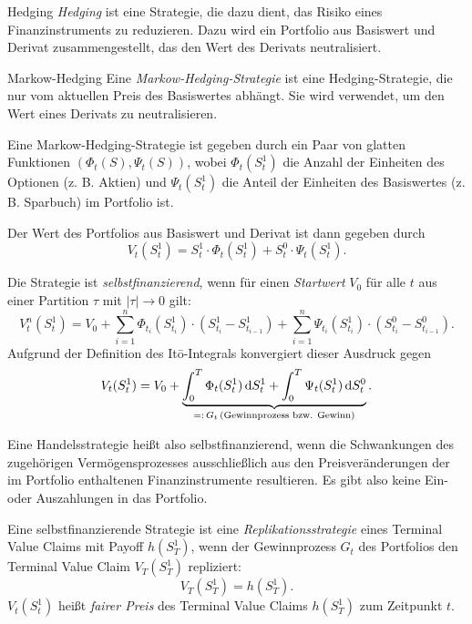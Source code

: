 \begin{bonus}{Hedging}
    \emph{Hedging} ist eine Strategie, die dazu dient, das Risiko eines Finanzinstruments zu reduzieren.
    Dazu wird ein Portfolio aus Basiswert und Derivat zusammengestellt, das den Wert des Derivats neutralisiert.
\end{bonus}

\begin{defi}{Markow-Hedging}
    Eine \emph{Markow-Hedging-Strategie} ist eine Hedging-Strategie, die nur vom aktuellen Preis des Basiswertes abhängt.
    Sie wird verwendet, um den Wert eines Derivats zu neutralisieren.

    Eine Markow-Hedging-Strategie ist gegeben durch ein Paar von glatten Funktionen $(\Phi_t(S), \Psi_t(S))$, wobei $\Phi_t(S_t^1)$ die Anzahl der Einheiten des Optionen (z. B. Aktien) und $\Psi_t(S_t^1)$ die Anteil der Einheiten des Basiswertes (z. B. Sparbuch) im Portfolio ist.

    Der Wert des Portfolios aus Basiswert und Derivat ist dann gegeben durch
    \[
        V_t(S_t^1) = S_t^1 \cdot \Phi_t(S_t^1) + S_t^0 \cdot \Psi_t(S_t^1).
    \]

    Die Strategie ist \emph{selbstfinanzierend}, wenn für einen \emph{Startwert} $V_0$ für alle $t$ aus einer Partition $\tau$ mit $|\tau| \to 0$ gilt:
    \[
        V_t^n(S_t^1) = V_0 + \sum_{i = 1}^{n} \Phi_{t_i}(S_{t_i}^1) \cdot (S_{t_i}^1 - S_{t_{i - 1}}^1) + \sum_{i = 1}^{n} \Psi_{t_i}(S_{t_i}^1) \cdot (S_{t_i}^0 - S_{t_{i - 1}}^0).
    \]
    Aufgrund der Definition des Itō-Integrals konvergiert dieser Ausdruck gegen
    \[
        V_t(S_t^1) = V_0 + \underbrace{\int_{0}^{T} \Phi_t(S_t^1) \, \mathrm{d}S_t^1 + \int_{0}^{T}  \Psi_t(S_t^1) \, \mathrm{d}S_t^0}_{=: \, G_t \, \text{(\emph{Gewinnprozess} bzw. \emph{Gewinn})}}.
    \]

    Eine Handelsstrategie heißt also selbstfinanzierend, wenn die Schwankungen des zugehörigen Vermögensprozesses ausschließlich aus den Preisveränderungen der im Portfolio enthaltenen Finanzinstrumente resultieren.
    Es gibt also keine Ein- oder Auszahlungen in das Portfolio.

    Eine selbstfinanzierende Strategie ist eine \emph{Replikationsstrategie} eines Terminal Value Claims mit Payoff $h(S_T^1)$, wenn der Gewinnprozess $G_t$ des Portfolios den Terminal Value Claim $V_T(S_T^1)$ repliziert:
    \[
        V_T(S_T^1) = h(S_T^1).
    \]
    $V_t(S_t^1)$ heißt \emph{fairer Preis} des Terminal Value Claims $h(S_T^1)$ zum Zeitpunkt $t$.
\end{defi}

